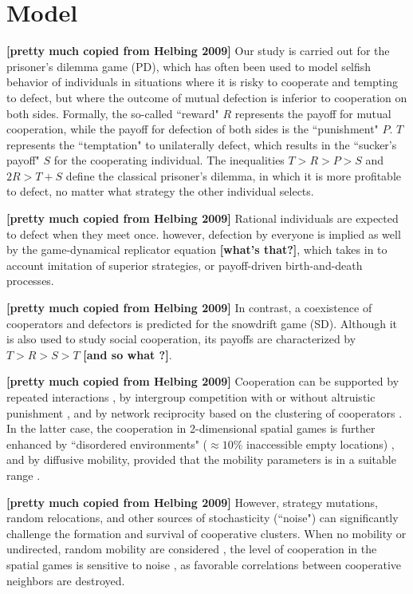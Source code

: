 \section*{Model}
{\bf [pretty much copied from Helbing 2009]} Our study is carried out for the prisoner's dilemma game (PD), which has often been used to model selfish behavior of individuals in situations where it is risky to cooperate and tempting to defect, but where the outcome of mutual defection is inferior to cooperation on both sides. Formally, the so-called ``reward" $R$ represents the payoff for mutual cooperation, while the payoff for defection of both sides is the ``punishment" $P$. $T$ represents the ``temptation" to unilaterally defect, which results in the ``sucker's payoff" $S$ for the cooperating individual. The inequalities $T > R > P > S$ and $2R > T + S$ define the classical prisoner's dilemma, in which it is more profitable to defect, no matter what strategy the other individual selects. 

{\bf [pretty much copied from Helbing 2009]} Rational individuals are expected to defect when they meet once. however, defection by everyone is implied as well by the game-dynamical replicator equation {\bf [what's that?]}, which takes in to account imitation of superior strategies, or payoff-driven birth-and-death processes. 

{\bf [pretty much copied from Helbing 2009]}  In contrast, a coexistence of cooperators and defectors is predicted for the snowdrift game (SD). Although it is also used to study social cooperation, its payoffs are characterized by $T > R > S > T$ {\bf [and so what ?]}.

{\bf [pretty much copied from Helbing 2009]} Cooperation can be supported by repeated interactions \cite{}, by intergroup competition with or without altruistic punishment \cite{}, and by network reciprocity based on the clustering of cooperators \cite{}. In the latter case, the cooperation  in 2-dimensional spatial games is further enhanced by ``disordered environments" ($\approx 10\%$ inaccessible empty locations) \cite{}, and by diffusive mobility, provided that the mobility parameters is in a suitable range \cite{}.

{\bf [pretty much copied from Helbing 2009]} However, strategy mutations, random relocations, and other sources of stochasticity (``noise") can significantly challenge the formation and survival of cooperative clusters. When no mobility or undirected, random mobility are considered , the level of cooperation in the spatial games is sensitive to noise \cite{helbing2009}, as favorable correlations between cooperative neighbors are destroyed. 

